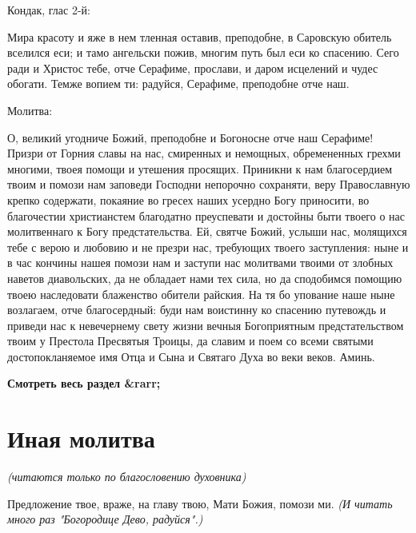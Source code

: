 \bfseries 

Кондак, глас 2-й:\normalfont{}


Мира красоту и яже в нем тленная оставив, преподобне, в Саровскую обитель вселился еси; и тамо ангельски пожив, многим путь был еси ко спасению. Сего ради и Христос тебе, отче Серафиме, прослави, и даром исцелений и чудес обогати. Темже вопием ти: радуйся, Серафиме, преподобне отче наш. 

\bfseries 

Молитва:\normalfont{}


О, великий угодниче Божий, преподобне и Богоносне отче наш Серафиме! Призри от Горния славы на нас, смиренных и немощных, обремененных грехми многими, твоея помощи и утешения просящих. Приникни к нам благосердием твоим и помози нам заповеди Господни непорочно сохраняти, веру Православную крепко содержати, покаяние во гресех наших усердно Богу приносити, во благочестии христианстем благодатно преуспевати и достойны быти твоего о нас молитвеннаго к Богу предстательства. Ей, святче Божий, услыши нас, молящихся тебе с верою и любовию и не презри нас, требующих твоего заступления: ныне и в час кончины нашея помози нам и заступи нас молитвами твоими от злобных наветов диавольских, да не обладает нами тех сила, но да сподобимся помощию твоею наследовати блаженство обители райския. На тя бо упование наше ныне возлагаем, отче благосердный: буди нам воистинну ко спасению путевождь и приведи нас к невечернему свету жизни вечныя Богоприятным предстательством твоим у Престола Пресвятыя Троицы, да славим и поем со всеми святыми достопокланяемое имя Отца и Сына и Святаго Духа во веки веков. Аминь. 


\mychapterending


\bfseries Смотреть весь раздел &rarr;\normalfont{} 

\section{Иная молитва}
 


\itshape (читаются только по благословению духовника)

\normalfont{}


Предложение твое, враже, на главу твою, Мати Божия, помози ми. \itshape (И читать много раз "Богородице Дево, радуйся".)

